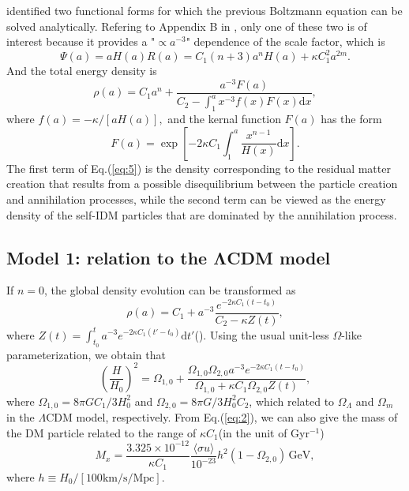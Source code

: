 \documentclass[twocolumn]{aastex631}
\begin{document}
   \cite{refId0} identified two functional forms for which
   the previous Boltzmann equation can be solved analytically.
   Refering to Appendix B in \cite{refId0}, only one of these two is of interest
   because it provides a "$\propto a^{-3}$" dependence of the scale factor,
   which is \begin{equation}
      \Psi(a)=aH(a)R(a)=C_1(n+3)a^nH(a)+\kappa C_1^2a^{2m}.
   \end{equation}
   And the total energy density is
   \begin{equation}
      \rho(a)=C_1a^n+\frac{a^{-3}F(a)}{C_2-\int_1^{a}x^{-3}f(x)F(x)\mathrm{d}x},\label{eq:5}
   \end{equation}
   where $f(a)=-\kappa/[aH(a)],$ and the kernal function $F(a)$ has
   the form \begin{equation}
      F(a)=\exp\left[-2\kappa C_1\int_1^{a}\frac{x^{n-1}}{H(x)}\mathrm{d}x\right].
   \end{equation}
   The first term of Eq.(\ref{eq:5}) is the density corresponding to the
   residual matter creation that results from a possible disequilibrium
   between the particle creation and annihilation processes, while the second
   term can be viewed as the energy density of the self-IDM particles that are
   dominated by the annihilation process.

\subsection{Model 1: relation to the ΛCDM model}

   If $n=0$, the global density evolution can be transformed as
   \begin{equation}
      \rho(a)=C_1+a^{-3}\frac{e^{-2\kappa C_1(t-t_0)}}{C_2-\kappa Z(t)},
   \end{equation}
   where $Z(t)=\int_{t_0}^ta^{-3}e^{-2\kappa C_1(t'-t_0)}\mathrm{d}t'$(\cite{refId0}).
   Using the usual unit-less $\Omega$-like parameterization, we obtain that
   \begin{equation}
      \left(\frac{H}{H_0}\right)^2=\Omega_{1,0}+\frac{\Omega_{1,0}\Omega_{2,0}a^{-3}e^{-2\kappa C_1(t-t_0)}}
      {\Omega_{1,0}+\kappa C_1\Omega_{2,0}Z(t)},\label{eq:8}
   \end{equation}
   where $\Omega_{1,0}=8\pi GC_1/3H_0^2$ and $\Omega_{2,0}=8\pi G/3H_0^2C_2$,
   which related to $\Omega_{\Lambda}$ and $\Omega_m$ in the $\Lambda$CDM model,
   respectively.
   From Eq.({\ref{eq:2}}), we can also give the mass of the DM particle
   related to the range of $\kappa C_1$(in the unit of Gyr${}^{-1}$)
   \begin{equation}
      M_x=\frac{3.325\times10^{-12}}{\kappa C_1}
      \frac{\langle\sigma u\rangle}{10^{-23}}h^2(1-\Omega_{2,0})\,\text{GeV},\label{eq:9}
   \end{equation}
   where $h\equiv H_0/[100\text{km/s/Mpc}]$.
\end{document}
